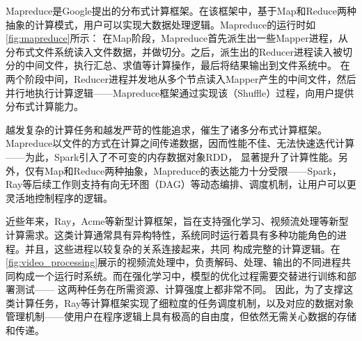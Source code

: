 Mapreduce是Google提出的分布式计算框架。在该框架中，基于Map和Reduce两种抽象的计算模式，用户可以实现大数据处理逻辑。Mapreduce的运行时如\autoref{fig:mapreduce}所示：
在Map阶段，Mapreduce首先派生出一些Mapper进程，从分布式文件系统读入文件数据，并做切分。之后，派生出的Reducer进程读入被切分的中间文件，执行汇总、求值等计算操作，最后将结果输出到文件系统中。
在两个阶段中间，Reducer进程并发地从多个节点读入Mapper产生的中间文件，然后并行地执行计算逻辑——Mapreduce框架通过实现该（Shuffle）过程，向用户提供分布式计算能力。

越发复杂的计算任务和越发严苛的性能追求，催生了诸多分布式计算框架。Mapreduce以文件的方式在计算之间传递数据，因而性能不佳、无法快速迭代计算——为此，Spark引入了不可变的内存数据对象RDD，
显著提升了计算性能。另外，仅有Map和Reduce两种抽象，Mapreduce的表达能力十分受限——Spark，Ray等后续工作则支持有向无环图（DAG）等动态编排、调度机制，让用户可以更灵活地控制程序的逻辑。

近些年来，Ray，Acme等新型计算框架，旨在支持强化学习、视频流处理等新型计算需求。这类计算通常具有异构特性，系统同时运行着具有多种功能角色的进程。并且，这些进程以较复杂的关系连接起来，共同
构成完整的计算逻辑。在\autoref{fig:video_processing}展示的视频流处理中，负责解码、处理、输出的不同进程共同构成一个运行时系统。而在强化学习中，模型的优化过程需要交替进行训练和部署测试——
这两种任务在所需资源、计算强度上都非常不同。
因此，为了支撑这类计算任务，Ray等计算框架实现了细粒度的任务调度机制，以及对应的数据对象管理机制——使用户在程序逻辑上具有极高的自由度，但依然无需关心数据的存储和传递。


	
	


